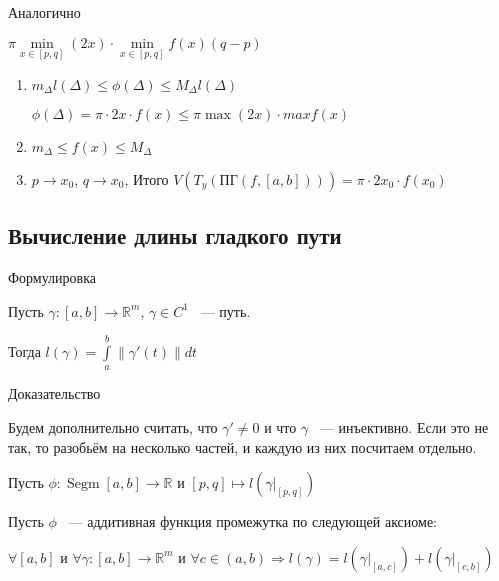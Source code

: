 \documentclass[../main.tex]{subfiles}
\begin{document}
\begin{enumerate}
                Аналогично
            
                $\pi \min\limits_{x \in [p, q]} (2x) \cdot \min\limits_{x \in [p, q]} f(x) (q - p)$
            
                \begin{enumerate}
            
                    \item $m_{\Delta} l(\Delta) \leq \phi(\Delta) \leq M_{\Delta} l(\Delta)$
                
                        $\phi(\Delta) = \pi \cdot 2 x \cdot f(x) \leq \pi \max (2x) \cdot max f(x)$
                    
                    \item $m_{\Delta} \leq f(x) \leq M_{\Delta}$
                
                    \item $p \rightarrow x_0$, $q \rightarrow x_0$, Итого $V(T_y(\text{ПГ}(f, [a, b]))) = \pi \cdot 2 x_0 \cdot f(x_0)$
                
                \end{enumerate}
            
            \end{enumerate}
\newpage


\subsection{Вычисление длины гладкого пути}
Формулировка
$$$$
        
            Пусть $\gamma : [a, b] \rightarrow \mathbb{R}^m$, $\gamma \in C^1$ ~--- путь.
            
            Тогда $l(\gamma) = \int\limits^b_a \| \gamma'(t) \| dt$
            
$$$$
Доказательство
$$$$
        
            Будем дополнительно считать, что $\gamma' \neq 0$ и что $\gamma$ ~--- инъективно. Если это не так, то разобьём на несколько частей, и каждую из них посчитаем отдельно.
            
            Пусть $\phi : \operatorname{Segm}[a, b] \rightarrow \mathbb{R}$ и $[p, q] \mapsto l\left(\gamma|_{[p, q]} \right)$
            
            Пусть $\phi$ ~--- аддитивная функция промежутка по следующей аксиоме:
            
            $\forall [a, b]$ и $\forall \gamma : [a, b] \rightarrow \mathbb{R}^m$ и $\forall c \in (a, b) \Longrightarrow l(\gamma) = l \left( \gamma|_{[a, c]} \right) + l \left( \gamma|_{[c, b]} \right)$
            
\end{document}
